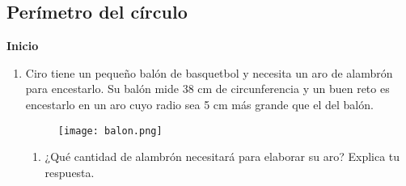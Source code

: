 \subsection{Perímetro del círculo}

\begin{boxK}
    \begin{center}\textbf{Inicio}\end{center}

    \begin{enumerate}
        \item Ciro tiene un pequeño balón de basquetbol y necesita un aro de alambrón para encestarlo.
              Su balón mide 38 cm de circunferencia y un buen
              reto es encestarlo en un aro cuyo radio sea 5 cm más grande que el del
              balón.
              \begin{figure}[H]
                  \centering
                  \texttt{[image: balon.png]}
                  \label{fig:balon}
              \end{figure}
              \begin{enumerate}
                  \item ¿Qué cantidad de alambrón necesitará para elaborar su aro? Explica tu respuesta.
              \end{enumerate}
    \end{enumerate}
\end{boxK}

